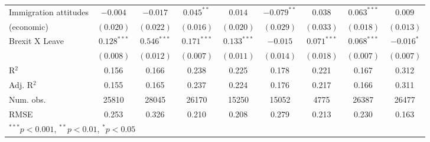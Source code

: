 \documentclass[12pt, letter]{article}
\begin{document}
\begin{table}[H]
\begin{center}
{\begin{tabular}{l c c c c c c c c }
Immigration attitudes  & $-0.004$       & $-0.017$       & $0.045^{**}$   & $0.014$        & $-0.079^{**}$  & $0.038$        & $0.063^{***}$  & $0.009$        \\
(economic)                                 & $(0.020)$      & $(0.022)$      & $(0.016)$      & $(0.020)$      & $(0.029)$      & $(0.033)$      & $(0.018)$      & $(0.013)$      \\
Brexit X Leave                   & $0.128^{***}$  & $0.546^{***}$  & $0.171^{***}$  & $0.133^{***}$  & $-0.015$       & $0.071^{***}$  & $0.068^{***}$  & $-0.016^{*}$   \\
                                 & $(0.008)$      & $(0.012)$      & $(0.007)$      & $(0.011)$      & $(0.014)$      & $(0.018)$      & $(0.007)$      & $(0.007)$      \\
\hline
R$^2$                            & 0.156          & 0.166          & 0.238          & 0.225          & 0.178          & 0.221          & 0.167          & 0.312          \\
Adj. R$^2$                       & 0.155          & 0.165          & 0.237          & 0.224          & 0.176          & 0.217          & 0.166          & 0.311          \\
Num. obs.                        & 25810          & 28045          & 26170          & 15250          & 15052          & 4775           & 26387          & 26477          \\
RMSE                             & 0.253          & 0.326          & 0.210          & 0.208          & 0.279          & 0.213          & 0.230          & 0.163          \\
\hline
\multicolumn{9}{l}{\scriptsize{$^{***}p<0.001$, $^{**}p<0.01$, $^*p<0.05$}}
\end{tabular}}
\end{center}
\end{table}



\printbibliography
\end{document}
